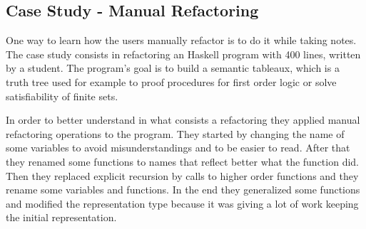 


\subsection{Case Study - Manual Refactoring}

One way to learn how the users manually refactor is to do it while taking notes.
The case study \cite{thompson2003case} consists in refactoring an Haskell program with 400 lines, written by a student.
The program's goal is to build a semantic tableaux, which is a truth tree used for example to proof procedures for first order logic or solve satisfiability of finite sets.

In order to better understand in what consists a refactoring they applied manual refactoring operations to the program.
They started by changing the name of some variables to avoid misunderstandings and to be easier to read.
After that they renamed some functions to names that reflect better what the function did. 
Then they replaced explicit recursion by calls to higher order functions and they rename some variables and functions.
In the end they generalized some functions and modified the representation type because it was giving a lot of work keeping the initial representation.

